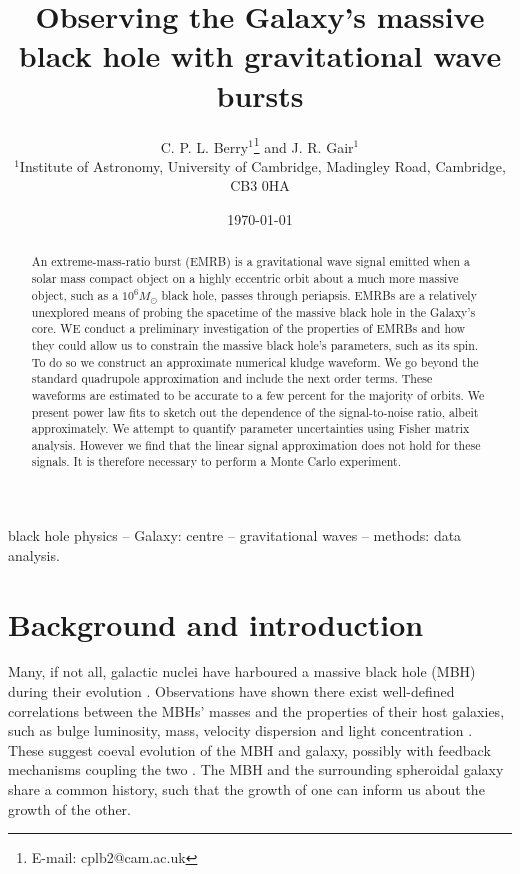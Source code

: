 \documentclass[useAMS,usedcolumn,usegraphicx,usenatbib]{mn2e}
\title[Observing the Galaxy's MBH with GW bursts]{Observing the Galaxy's massive black hole with gravitational wave bursts}
\author[C. P. L. Berry and J. R. Gair]{C. P. L. Berry$^{1}$\thanks{E-mail:
cplb2@cam.ac.uk}  and J. R. Gair$^{1}$\\
$^{1}$Institute of Astronomy, University of Cambridge, Madingley Road, Cambridge, CB3 0HA}
\begin{document}
\date{\today}

\pagerange{\pageref{firstpage}--\pageref{lastpage}} 

\maketitle

\label{firstpage}

\begin{abstract}
An extreme-mass-ratio burst (EMRB) is a gravitational wave signal emitted when a solar mass compact object on a highly eccentric orbit about a much more massive object, such as a $10^6 M_\odot$ black hole, passes through periapsis. EMRBs are a relatively unexplored means of probing the spacetime of the massive black hole in the Galaxy's core. WE conduct a preliminary investigation of the properties of EMRBs and how they could allow us to constrain the massive black hole's parameters, such as its spin. To do so we construct an approximate numerical kludge waveform. We go beyond the standard quadrupole approximation and include the next order terms. These waveforms are estimated to be accurate to a few percent for the majority of orbits. We present power law fits to sketch out the dependence of the signal-to-noise ratio, albeit approximately. We attempt to quantify parameter uncertainties using Fisher matrix analysis. However we find that the linear signal approximation does not hold for these signals. It is therefore necessary to perform a Monte Carlo experiment.
\end{abstract}

\begin{keywords}
black hole physics -- Galaxy: centre -- gravitational waves -- methods: data analysis.
\end{keywords}

\section{Background and introduction}\label{sec:Intro}

Many, if not all, galactic nuclei have harboured a massive black hole (MBH) during their evolution \citep{Lynden-Bell1971, Soltan1982, Rees1984}. Observations have shown there exist well-defined correlations between the MBHs' masses and the properties of their host galaxies, such as bulge luminosity, mass, velocity dispersion and light concentration \citep{Kormendy1995, Magorrian1998, Ferrarese2000, Gebhardt2000, Graham2001, Tremaine2002, Marconi2003, Haring2004, Graham2007, Graham2011}. These suggest coeval evolution of the MBH and galaxy, possibly with feedback mechanisms coupling the two \citep{Haiman2004, Volonteri2009}. The MBH and the surrounding spheroidal galaxy share a common history, such that the growth of one can inform us about the growth of the other.
\end{document}
